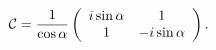 \begin{equation}
{\cal C}=\frac{1}{\cos\alpha}\left(\begin{array}{cc} i\sin\alpha &
1 \cr 1 & -i\sin\alpha \end{array}\right). \label{e23}
\end{equation}

